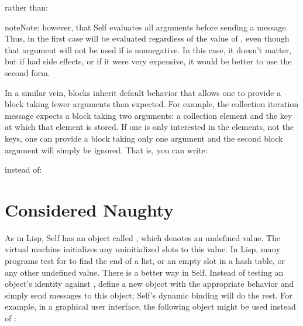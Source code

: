 \documentclass[letterpaper,10pt,english]{sphinxmanual}
\begin{document}
rather than:

\begin{sphinxVerbatim}[commandchars=\\\{\}]
    \PYG{p}{[}  \PYG{p}{]}  \PYG{p}{[}   \PYG{p}{]}
\end{sphinxVerbatim}

\begin{sphinxadmonition}{note}{Note:}
however, that Self evaluates all arguments before sending a message. Thus, in the first case
 will be evaluated regardless of the value of , even though that argument will not be
used if  is nonnegative. In this case, it doesn’t matter, but if  had side effects,
or if it were very expensive, it would be better to use the second form.
\end{sphinxadmonition}

In a similar vein, blocks inherit default behavior that allows one to provide a block taking fewer
arguments than expected. For example, the collection iteration message  expects a block taking
two arguments: a collection element and the key at which that element is stored. If one is only
interested in the elements, not the keys, one can provide a block taking only one argument and the
second block argument will simply be ignored. That is, you can write:

\begin{sphinxVerbatim}[commandchars=\\\{\}]
  \PYG{p}{[}    \PYG{p}{]}
\end{sphinxVerbatim}

instead of:

\begin{sphinxVerbatim}[commandchars=\\\{\}]
  \PYG{p}{[}     \PYG{p}{]}
\end{sphinxVerbatim}


\section{ Considered Naughty}
\label{\detokenize{progguid:nil-considered-naughty}}
As in Lisp, Self has an object called , which denotes an undefined value. The virtual machine
initializes any uninitialized slots to this value. In Lisp, many programs test for  to find the end
of a list, or an empty slot in a hash table, or any other undefined value. There is a better way in
Self. Instead of testing an object’s identity against , define a new object with the appropriate
behavior and simply send messages to this object; Self’s dynamic binding will do the rest. For example,
in a graphical user interface, the following object might be used instead of :
\end{document}
